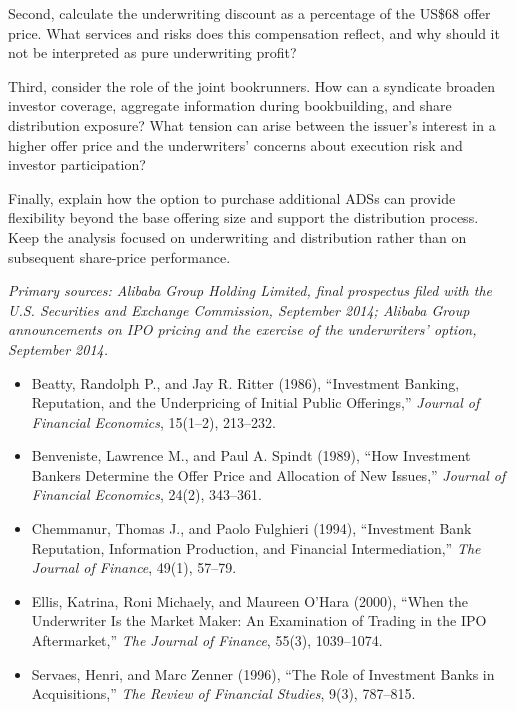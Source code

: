 Second, calculate the underwriting discount as a percentage of the US\$68 offer price. What services and risks does this compensation reflect, and why should it not be interpreted as pure underwriting profit?

Third, consider the role of the joint bookrunners. How can a syndicate broaden investor coverage, aggregate information during bookbuilding, and share distribution exposure? What tension can arise between the issuer's interest in a higher offer price and the underwriters' concerns about execution risk and investor participation?

Finally, explain how the option to purchase additional ADSs can provide flexibility beyond the base offering size and support the distribution process. Keep the analysis focused on underwriting and distribution rather than on subsequent share-price performance.

\emph{Primary sources: Alibaba Group Holding Limited, final prospectus filed with the U.S. Securities and Exchange Commission, September 2014; Alibaba Group announcements on IPO pricing and the exercise of the underwriters' option, September 2014.}



\begin{itemize}

\item Beatty, Randolph P., and Jay R. Ritter (1986),
``Investment Banking, Reputation, and the Underpricing of Initial Public Offerings,''
\emph{Journal of Financial Economics}, 15(1--2), 213--232.

\item Benveniste, Lawrence M., and Paul A. Spindt (1989),
``How Investment Bankers Determine the Offer Price and Allocation of New Issues,''
\emph{Journal of Financial Economics}, 24(2), 343--361.

\item Chemmanur, Thomas J., and Paolo Fulghieri (1994),
``Investment Bank Reputation, Information Production, and Financial Intermediation,''
\emph{The Journal of Finance}, 49(1), 57--79.

\item Ellis, Katrina, Roni Michaely, and Maureen O'Hara (2000),
``When the Underwriter Is the Market Maker: An Examination of Trading in the IPO Aftermarket,''
\emph{The Journal of Finance}, 55(3), 1039--1074.

\item Servaes, Henri, and Marc Zenner (1996),
``The Role of Investment Banks in Acquisitions,''
\emph{The Review of Financial Studies}, 9(3), 787--815.

\end{itemize}


